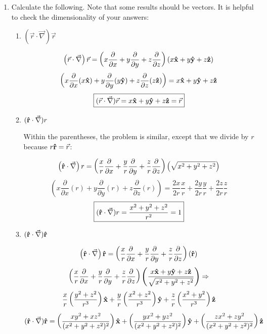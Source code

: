 \begin{enumerate}
\begin{enumerate}
\begin{itemize}
        \end{itemize}

    \end{enumerate}

  \item Calculate the following. Note that some results should be vectors.  It is helpful to check the dimensionality of your answers:

    \begin{enumerate}

      \item $(\vec{r}\cdot\vec{\nabla})\vec{r}$

        $$\left(\vec{r}\cdot\vec{\nabla}\right)\vec{r}=\left(x\frac{\partial}{\partial x}+y\frac{\partial}{\partial y}+z\frac{\partial}{\partial z}\right)\left( x\bold{\hat{x}}+y\bold{\hat{y}}+z\bold{\hat{z}} \right)$$
        $$\left(x\frac{\partial}{\partial x}(x\bold{\hat{x}})+y\frac{\partial}{\partial y}(y\bold{\hat{y}})+z\frac{\partial}{\partial z}(z\bold{\hat{z}})\right)=x\bold{\hat{x}}+y\bold{\hat{y}}+z\bold{\hat{z}}$$
        $$\boxed{(\vec{r}\cdot\vec{\nabla})\vec{r}=x\bold{\hat{x}}+y\bold{\hat{y}}+z\bold{\hat{z}}=\vec{r}}$$

      \item $(\bold{\hat{r}}\cdot\vec{\nabla})r$

        Within the parentheses, the problem is similar, except that we divide by $r$ because $r\bold{\hat{r}}=\vec{r}$:

        $$\left(\bold{\hat{r}}\cdot\vec{\nabla}\right)r=\left(\frac{x}{r}\frac{\partial}{\partial x}+\frac{y}{r}\frac{\partial}{\partial y}+\frac{z}{r}\frac{\partial}{\partial z}\right)\left( \sqrt{x^2+y^2+z^2}\right)$$
        $$\left(x\frac{\partial}{\partial x}(r)+y\frac{\partial}{\partial y}(r)+z\frac{\partial}{\partial z}(r)\right)=\frac{2x}{2r}\frac{x}{r}+\frac{2y}{2r}\frac{y}{r}+\frac{2z}{2r}\frac{z}{r}$$
        $$\boxed{(\bold{\hat{r}}\cdot\vec{\nabla})r=\frac{x^2+y^2+z^2}{r^2}=1}$$

      \item $(\bold{\hat{r}}\cdot\vec{\nabla})\bold{\hat{r}}$

        $$\left(\bold{\hat{r}}\cdot\vec{\nabla}\right)\bold{\hat{r}}=\left(\frac{x}{r}\frac{\partial}{\partial x}+\frac{y}{r}\frac{\partial}{\partial y}+\frac{z}{r}\frac{\partial}{\partial z}\right)\left( \bold{\hat{r}}\right)$$
        $$\left(\frac{x}{r}\frac{\partial}{\partial x}+\frac{y}{r}\frac{\partial}{\partial y}+\frac{z}{r}\frac{\partial}{\partial z}\right)\left( \frac{x\bold{\hat{x}}+y\bold{\hat{y}}+z\bold{\hat{z}}}{\sqrt{x^2+y^2+z^2}}\right)\Rightarrow$$
        $$\frac{x}{r}\left( \frac{y^2+z^2}{r^3} \right)\bold{\hat{x}}+\frac{y}{r}\left( \frac{x^2+z^2}{r^3} \right)\bold{\hat{y}}+\frac{z}{r}\left( \frac{x^2+y^2}{r^3} \right)\bold{\hat{z}}$$
      $$(\bold{\hat{r}}\cdot\vec{\nabla})\bold{\hat{r}}=\left(\frac{xy^2+xz^2}{(x^2+y^2+z^2)^2} \right)\bold{\hat{x}}+\left( \frac{yx^2+yz^2}{(x^2+y^2+z^2)^2} \right)\bold{\hat{y}}+\left( \frac{zx^2+zy^2}{(x^2+y^2+z^2)^2} \right)\bold{\hat{z}}$$


\end{enumerate}
\end{enumerate}
